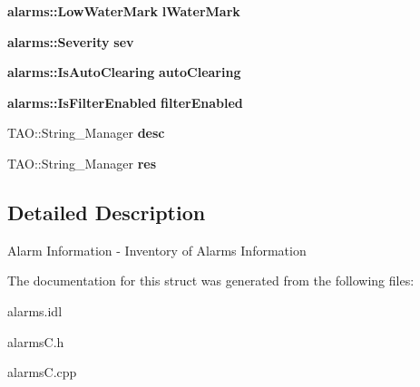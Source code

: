 \begin{DoxyCompactItemize}
\item 
{\bf alarms\+::\+Low\+Water\+Mark} {\bfseries l\+Water\+Mark}\label{structalarms_1_1AlarmInformation_a9713a595ead9d6a58e751f80928494e8}

\item 
{\bf alarms\+::\+Severity} {\bfseries sev}\label{structalarms_1_1AlarmInformation_a3bf0415fa59f93da73e8f81263396638}

\item 
{\bf alarms\+::\+Is\+Auto\+Clearing} {\bfseries auto\+Clearing}\label{structalarms_1_1AlarmInformation_a2dd9d9474096807bce1b02dce7106fa6}

\item 
{\bf alarms\+::\+Is\+Filter\+Enabled} {\bfseries filter\+Enabled}\label{structalarms_1_1AlarmInformation_abab2a389f2ce4f6512a6bba8f71866be}

\item 
T\+A\+O\+::\+String\+\_\+\+Manager {\bfseries desc}\label{structalarms_1_1AlarmInformation_a9bf6b995831cb726d4fba27d614b4c57}

\item 
T\+A\+O\+::\+String\+\_\+\+Manager {\bfseries res}\label{structalarms_1_1AlarmInformation_a15f71cf404d699feda302e58b39a425b}

\end{DoxyCompactItemize}


\subsection{Detailed Description}
Alarm Information -\/ Inventory of Alarms Information 

The documentation for this struct was generated from the following files\+:\begin{DoxyCompactItemize}
\item 
alarms.\+idl\item 
alarms\+C.\+h\item 
alarms\+C.\+cpp\end{DoxyCompactItemize}
